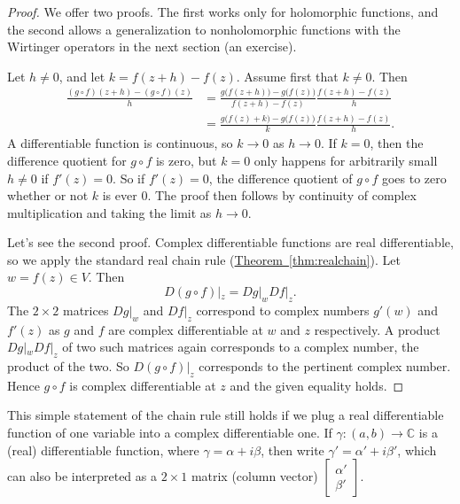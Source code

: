 \documentclass[12pt,openany]{book}
\newcommand{\C}{{\mathbb{C}}}
\theoremstyle{plain}
\theoremstyle{remark}
\theoremstyle{definition}
\theoremstyle{exercise}
\theoremstyle{example}
\newcommand{\thmref}[1]{\hyperref[#1]{Theorem~\ref*{#1}}}
\begin{document}
\begin{proof}
We offer two proofs.  The first works only for holomorphic
functions, and the second allows a generalization to nonholomorphic functions
with the Wirtinger operators in the next section (an exercise).

Let $h \not= 0$, and let $k = f(z+h) -f(z)$.
Assume first that $k\not=0$.
Then
\begin{equation*}
\begin{split}
\frac{(g \circ f)(z+h) - (g \circ f)(z)}{h}
& =
\frac{g \bigl( f(z+h) \bigr) - g\bigl( f(z) \bigr)}{f(z+h)-f(z)}
\frac{f(z+h)-f(z)}{h}
\\
& =
\frac{g \bigl( f(z) + k \bigr) - g\bigl( f(z) \bigr)}{k}
\frac{f(z+h)-f(z)}{h} .
\end{split}
\end{equation*}
A differentiable function is continuous, so $k \to 0$ as $h \to 0$.
If $k=0$, then the difference quotient for $g \circ f$ is zero, but $k=0$
only happens for arbitrarily small $h\not=0$ if
$f'(z)=0$.  So if $f'(z)=0$,
the difference 
quotient of $g \circ f$ goes to zero whether or
not $k$ is ever $0$.
The proof then follows by continuity of complex multiplication and taking
the limit as $h \to 0$.

Let's see the second proof.
Complex differentiable functions are real differentiable, so
we apply the standard real chain rule (\thmref{thm:realchain}).
Let $w = f(z) \in V$.  Then
\begin{equation*}
D(g \circ f)|_z = Dg|_w Df|_z .
\end{equation*}
The $2 \times 2$ matrices $Dg|_w$ and $Df|_z$ correspond to complex
numbers $g'(w)$ and $f'(z)$ as $g$ and $f$ are complex differentiable at $w$ and $z$
respectively.
A product $Dg|_w Df|_z$
of two such matrices again corresponds to a complex number, the product of
the two.
So $D(g \circ f)|_z$ corresponds to the pertinent complex number.
Hence $g \circ f$ is complex differentiable at $z$ and the given equality holds.
\end{proof}

This simple statement of the chain rule still holds
if we plug a real differentiable function of one variable
into a complex differentiable
one.  If $\gamma \colon (a,b)
\to \C$ is a (real) differentiable function, where
$\gamma = \alpha + i \beta$,
then write $\gamma' = \alpha' + i \beta'$, which can also be interpreted
as a $2 \times 1$ matrix (column vector)
$\left[\begin{smallmatrix}\alpha'\\\beta'\end{smallmatrix}\right]$.
\end{document}
